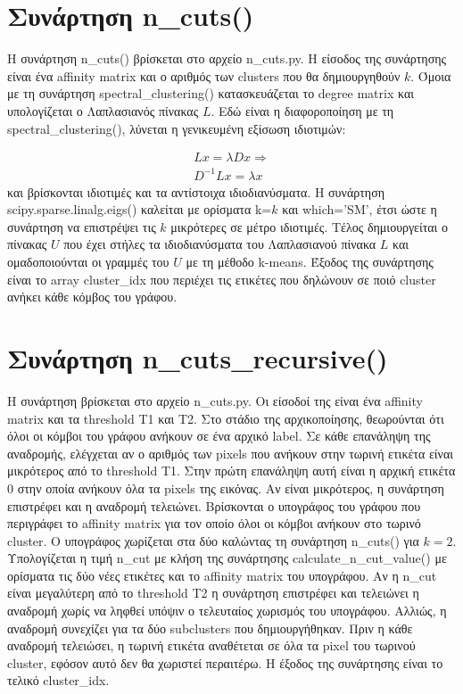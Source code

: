 \documentclass{article}
\begin{document}
\section{Συνάρτηση n\_cuts()}
Η συνάρτηση n\_cuts() βρίσκεται στο αρχείο n\_cuts.py. Η είσοδος της συνάρτησης 
είναι ένα affinity matrix και ο αριθμός των clusters που θα δημιουργηθούν $k$.
Όμοια με τη συνάρτηση spectral\_clustering() κατασκευάζεται το degree matrix 
και υπολογίζεται ο Λαπλασιανός πίνακας $L$. Εδώ είναι η διαφοροποίηση με τη
spectral\_clustering(), λύνεται η γενικευμένη εξίσωση ιδιοτιμών:

\begin{gather}
    Lx = \lambda Dx \Rightarrow \\
    D^{-1} Lx = \lambda x
\end{gather}
και βρίσκονται ιδιοτιμές και τα αντίστοιχα ιδιοδιανύσματα. Η συνάρτηση 
scipy.sparse.linalg.eigs() καλείται με ορίσμα\-τα k=$k$ και 
which='SM', έτσι ώστε η συνάρτηση να επιστρέψει τις $k$ μικρότερες σε μέτρο
ιδιοτιμές. Τέλος δημιουργεί\-ται ο πίνακας $U$
που έχει στήλες τα ιδιοδιανύσματα του Λαπλασιανού πίνακα $L$ και ομαδοποιούνται
οι γραμμές του $U$ με τη μέθοδο k-means. Έξοδος της συνάρτησης είναι το array 
cluster\_idx που περιέχει τις ετικέτες που δηλώνουν σε ποιό cluster ανήκει κάθε
κόμβος του γράφου.

\section{Συνάρτηση n\_cuts\_recursive()}
Η συνάρτηση βρίσκεται στο αρχείο n\_cuts.py. Οι είσοδοί της είναι ένα affinity matrix 
και τα threshold T1 και T2. Στο στάδιο της αρχικοποίησης, θεωρούνται ότι όλοι
οι κόμβοι του γράφου ανήκουν σε ένα αρχικό label. Σε κάθε επανάληψη της αναδρομής,
ελέγχεται αν ο αριθμός των pixels που ανήκουν στην τωρινή ετικέτα είναι μικρότερος
από το threshold T1. Στην πρώτη επανάληψη αυτή είναι η αρχική ετικέτα 0 στην οποία 
ανήκουν όλα τα pixels της εικόνας. Αν είναι μικρότερος, η συνάρτηση επιστρέφει 
και η αναδρομή τελειώνει. Βρίσκονται ο υπογράφος του γράφου που περιγράφει το
affinity matrix για τον οποίο όλοι οι κόμβοι ανήκουν στο τωρινό cluster. Ο
υπογράφος χωρίζεται στα δύο καλώντας τη συνάρτηση n\_cuts() για $k=2$. 
Υπολογίζεται η τιμή n\_cut με κλήση της συνάρτησης calculate\_n\_cut\_value()
με ορίσματα τις δύο νέες ετικέτες και το affinity matrix του υπογράφου.
Αν η n\_cut είναι μεγαλύτερη από το threshold T2 η συνάρτηση επιστρέφει και τελειώνει η
αναδρομή χωρίς να ληφθεί υπόψιν ο τελευταίος χωρισμός του υπογράφου. Αλλιώς,
η αναδρομή συνεχίζει για τα δύο subclusters που δημιουργήθηκαν. Πριν η 
κάθε αναδρομή τελειώσει, η τωρινή ετικέτα αναθέτεται σε όλα τα pixel
του τωρινού cluster, εφόσον αυτό δεν θα χωριστεί περαιτέρω. Η έξοδος της
συνάρτησης είναι το τελικό cluster\_idx.
\end{document}

